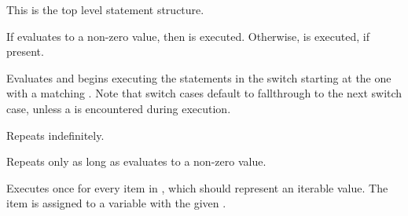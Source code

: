 This is the top level statement structure.

\begin{grammar}
\end{grammar}

If  evaluates to a non-zero value, then 
is executed. Otherwise,  is executed, if present.

\begin{grammar}
\grRuleCont{\grEmpty}
\end{grammar}

Evaluates  and begins executing the statements in the switch
starting at the one with a matching . Note that
switch cases default to fallthrough to the next switch case, unless a
 is encountered during execution.

\begin{grammar}
\end{grammar}

Repeats  indefinitely.

\begin{grammar}
\end{grammar}

Repeats  only as long as  evaluates to a
non-zero value.

\begin{grammar}
\end{grammar}

Executes  once for every item in , which should
represent an iterable value. The item is assigned to a variable with
the given .
